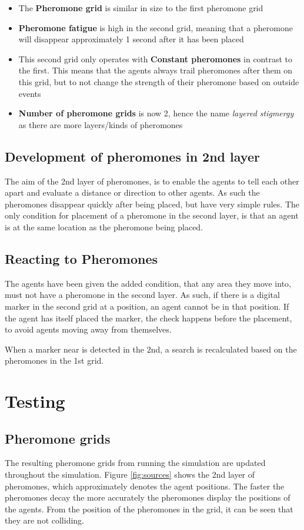 \begin{itemize}
\item{The \textbf{Pheromone grid} is similar in size to the first pheromone grid}
\item{\textbf{Pheromone fatigue} is high in the second grid, meaning that a pheromone will disappear approximately 1 second after it has been placed}
\item{This second grid only operates with \textbf{Constant pheromones} in contrast to the first. This means that the agents always trail pheromones after them on this grid, but to not change the strength of their pheromone based on outside events}
\item{\textbf{Number of pheromone grids} is now 2, hence the name \textit{layered stigmergy} as there are more layers/kinds of pheromones}
\end{itemize}

\subsection{Development of pheromones in 2nd layer}
The aim of the 2nd layer of pheromones, is to enable the agents to tell each other apart and evaluate a distance or direction to other agents. As such the pheromones disappear quickly after being placed, but have very simple rules. The only condition for placement of a pheromone in the second layer, is that an agent is at the same location as the pheromone being placed.

\subsection{Reacting to Pheromones}
The agents have been given the added condition, that any area they move into, must not have a pheromone in the second layer. As such, if there is a digital marker in the second grid at a position, an agent cannot be in that position. If the agent has itself placed the marker, the check happens before the placement, to avoid agents moving away from themselves. 

When a marker near is detected in the 2nd, a search is recalculated based on the pheromones in the 1st grid.

\section{Testing}
\label{chap:stigmergy_test}

\subsection{Pheromone grids}
The resulting pheromone grids from running the simulation are updated throughout the simulation. Figure \ref{fig:sources} shows the 2nd layer of pheromones, which approximately denotes the agent positions. The faster the pheromones decay the more accurately the pheromones display the positions of the agents. From the position of the pheromones in the grid, it can be seen that they are not colliding.

